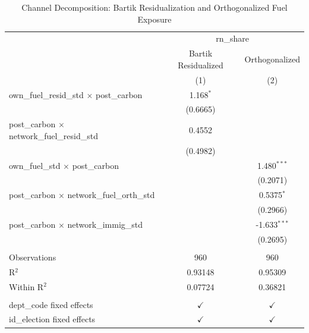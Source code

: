 \begin{table}[htbp]
   \caption{\label{tab:channel_decomposition} Channel Decomposition: Bartik Residualization and Orthogonalized Fuel Exposure}
   \bigskip
   \centering
   \begin{tabular}{lcc}
      \toprule
       & \multicolumn{2}{c}{rn\_share}\\
                                                           & Bartik Residualized & Orthogonalized \\   
                                                           & (1)                 & (2)\\  
      \midrule 
      own\_fuel\_resid\_std $\times$ post\_carbon          & 1.168$^{*}$         &   \\   
                                                           & (0.6665)            &   \\   
      post\_carbon $\times$ network\_fuel\_resid\_std      & 0.4552              &   \\   
                                                           & (0.4982)            &   \\   
      own\_fuel\_std $\times$ post\_carbon                 &                     & 1.480$^{***}$\\   
                                                           &                     & (0.2071)\\   
      post\_carbon $\times$ network\_fuel\_orth\_std       &                     & 0.5375$^{*}$\\   
                                                           &                     & (0.2966)\\   
      post\_carbon $\times$ network\_immig\_std            &                     & -1.633$^{***}$\\   
                                                           &                     & (0.2695)\\   
       \\
      Observations                                         & 960                 & 960\\  
      R$^2$                                                & 0.93148             & 0.95309\\  
      Within R$^2$                                         & 0.07724             & 0.36821\\  
       \\
      dept\_code fixed effects                             & $\checkmark$        & $\checkmark$\\   
      id\_election fixed effects                           & $\checkmark$        & $\checkmark$\\   
      \bottomrule
   \end{tabular}
   

\end{table}
